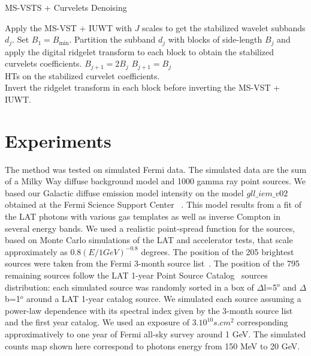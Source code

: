 \begin{algorithm}
\caption{MS-VSTS + Curvelets Denoising}
\label{algcurv}
\begin{algorithmic}[1]
\STATE Apply the MS-VST + IUWT with $J$ scales to get the stabilized wavelet subbands $d_j$.
\STATE Set $B_1 = B_{\min}$.
\STATE Partition the subband $d_j$ with blocks of side-length $B_j$ and apply the digital ridgelet transform to each block to obtain the stabilized curvelets coefficients.
\STATE $B_{j+1} = 2 B_j$
\ELSE
\STATE $B_{j+1} =  B_j$
\ENDIF \\
\STATE HTs on the stabilized curvelet coefficients.
\ENDFOR \\
\STATE Invert the ridgelet transform in each block before inverting the MS-VST + IUWT.

\end{algorithmic}
\end{algorithm}


\section{Experiments}

The method was tested on simulated Fermi data. The simulated data are the sum of a Milky Way diffuse background model and 1000 gamma ray point sources. We based our Galactic diffuse emission model intensity on the model $gll\_iem\_v02$ obtained at the Fermi Science Support Center~\citep{Models}
. This model results from a fit of the LAT photons with various gas templates as well as inverse Compton in several energy bands. We used a realistic point-spread function for the sources, based on Monte Carlo simulations of the LAT and accelerator tests, that scale approximately as $0.8(E/1GeV)^{-0.8}$ degrees. The position of the 205 brightest sources were taken from the Fermi 3-month source list~\citep{Abdo}. The position of the 795 remaining sources follow the LAT 1-year Point Source Catalog~\citep{Catalog}
  sources distribution: each simulated source was randomly sorted in a box of $\Delta$l=5$^o$ and $\Delta$b=1$^o$ around a LAT 1-year catalog source. We simulated each source assuming a power-law dependence with its spectral index given by the 3-month source list and the first year catalog. We used an exposure of $3.10^{10} s.cm^2$ corresponding approximatively to one year of Fermi all-sky survey around 1 GeV. The simulated counts map shown here correspond to photons energy from 150 MeV to 20 GeV.


